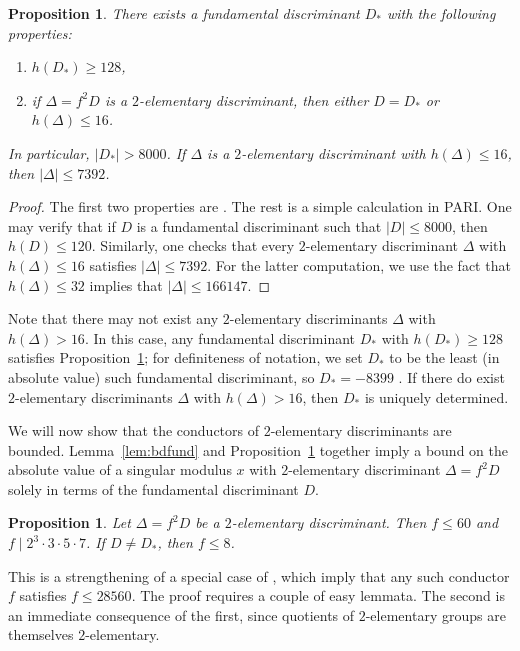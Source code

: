 \documentclass[12pt,a4paper,oneside]{amsart}
\newtheorem{proposition}[theorem]{Proposition}
\begin{document}
\begin{proposition}\label{prop:Tat}
There exists a fundamental discriminant $D_*$ with the following properties:
\begin{enumerate}
    \item $h(D_*) \geq 128$,
    \item if $\Delta = f^2 D$ is a $2$-elementary discriminant, then either $D = D_*$ or $h(\Delta) \leq 16$.
\end{enumerate}
In particular, $\lvert D_* \rvert > 8000$. If $\Delta$ is a $2$-elementary discriminant with $h(\Delta) \leq 16$, then $\lvert \Delta \rvert \leq 7392$.
\end{proposition}

\begin{proof}
    The first two properties are \cite[Prop.~2.11]{BiluGunTron22}. The rest is a simple calculation in PARI. One may verify that if $D$ is a fundamental discriminant such that $\lvert D \rvert \leq 8000$, then $h(D) \leq 120$. Similarly, one checks that every $2$-elementary discriminant $\Delta$ with $h(\Delta) \leq 16$ satisfies $\lvert \Delta \rvert \leq 7392$. For the latter computation, we use the fact \cite[Prop.~7.3]{Fowler24} that $h(\Delta) \leq 32$ implies that $\lvert \Delta \rvert \leq 166147$.
\end{proof}


Note that there may not exist any $2$-elementary discriminants $\Delta$ with $h(\Delta) > 16$. In this case, any fundamental discriminant $D_*$ with $h(D_*) \geq 128$ satisfies Proposition~\ref{prop:Tat}; for definiteness of notation, we set $D_*$ to be the least (in absolute value) such fundamental discriminant, so $D_* = -8399$ . If there do exist $2$-elementary discriminants $\Delta$ with $h(\Delta) > 16$, then $D_*$ is uniquely determined.

We will now show that the conductors of $2$-elementary discriminants are bounded. Lemma~\ref{lem:bdfund} and Proposition~\ref{prop:2elemcond} together imply a bound on the absolute value of a singular modulus $x$ with $2$-elementary discriminant $\Delta = f^2 D$ solely in terms of the fundamental discriminant $D$.

\begin{proposition}\label{prop:2elemcond}
	Let $\Delta = f^2 D$ be a $2$-elementary discriminant. Then $f \leq 60$ and $f \mid 2^3 \cdot 3 \cdot 5 \cdot 7$. If $D \neq D_*$, then $f \leq 8$.
\end{proposition}

This is a strengthening of a special case of \cite[Propositions~2.9 \& 2.10]{BiluGunTron22}, which imply that any such conductor $f$ satisfies $f \leq 28560$. 
The proof requires a couple of easy lemmata.
The second is an immediate consequence of the first, since quotients of $2$-elementary groups are themselves $2$-elementary.
\end{document}
